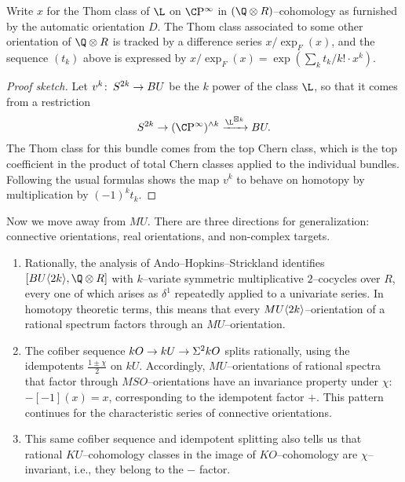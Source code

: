 \begin{lemma}
Write $x$ for the Thom class of $\L$ on $\CP^\infty$ in $(\Q \otimes R)$--cohomology as furnished by the automatic orientation $D$.  The Thom class associated to some other orientation of $\Q \otimes R$ is tracked by a difference series $x / \exp_F(x)$, and the sequence $(t_k)$ above is expressed by $x / \exp_F(x) = \exp(\sum_k t_k/k! \cdot x^k)$.
\end{lemma}
\begin{proof}[Proof sketch]
Let $v^k\colon\thinspace S^{2k} \to BU$ be the $k${\th} power of the class $\L$, so that it comes from a restriction \[S^{2k} \to (\CP^\infty)^{\sm k} \xrightarrow{\L^{\boxtimes k}} BU.\]  The Thom class for this bundle comes from the top Chern class, which is the top coefficient in the product of total Chern classes applied to the individual bundles.  Following the usual formulas shows the map $v^k$ to behave on homotopy by multiplication by $(-1)^k t_k$.
\end{proof}

Now we move away from $MU$.  There are three directions for generalization: connective orientations, real orientations, and non-complex targets.
\begin{enumerate}
\item Rationally, the analysis of Ando--Hopkins--Strickland identifies $[BU\<2k\>, \Q \otimes R]$ with $k$--variate symmetric multiplicative $2$--cocycles over $R$, every one of which arises as $\delta^1$ repeatedly applied to a univariate series.  In homotopy theoretic terms, this means that every $MU\langle2k\rangle$--orientation of a rational spectrum factors through an $MU$--orientation.
\item The cofiber sequence $kO \to kU \to \Sigma^2 kO$ splits rationally, using the idempotents $\frac{1 \pm \chi}{2}$ on $kU$.  Accordingly, $MU$--orientations of rational spectra that factor through $MSO$--orientations have an invariance property under $\chi$: $-[-1](x) = x$, corresponding to the idempotent factor $+$.  This pattern continues for the characteristic series of connective orientations.
\item This same cofiber sequence and idempotent splitting also tells us that rational $KU$--cohomology classes in the image of $KO$--cohomology are $\chi$--invariant, i.e., they belong to the $-$ factor.
\end{enumerate}

